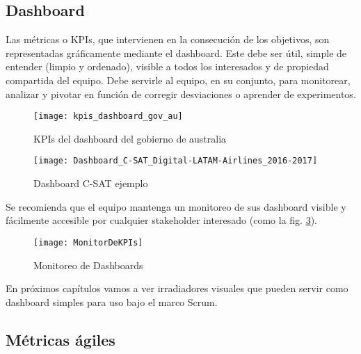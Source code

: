 \subsection{Dashboard}

Las métricas o KPIs, que intervienen en la consecución de los objetivos, son representadas gráficamente mediante el dashboard. Este debe ser útil, simple de entender (limpio y ordenado), visible a todos los interesados y de propiedad compartida del equipo. Debe servirle al equipo, en su conjunto, para monitorear, analizar y pivotar en función de corregir desviaciones o aprender de experimentos.

  \begin{figure}[h]
  \centering
  \texttt{[image: kpis\_dashboard\_gov\_au]}
  \caption{KPIs del dashboard del gobierno de australia}
  \centering
  \label{fig:kpis_dashboard_gov_au} %
  \end{figure}
  \FloatBarrier

  \begin{figure}[h]
  \centering
  \texttt{[image: Dashboard\_C-SAT\_Digital-LATAM-Airlines\_2016-2017]}
  \caption{Dashboard C-SAT ejemplo}
  \centering
  \label{fig:Dashboard_C-SAT_Digital-LATAM-Airlines_2016-2017} %
  \end{figure}
  \FloatBarrier
  
  Se recomienda que el equipo mantenga un monitoreo de sus dashboard visible y fácilmente accesible por cualquier stakeholder interesado (como la fig. \ref{fig:MonitorDeKPIs}).
  
  \begin{figure}[h]
  \centering
  \texttt{[image: MonitorDeKPIs]}
  \caption{Monitoreo de Dashboards}
  \centering
  \label{fig:MonitorDeKPIs} %
\end{figure}
\FloatBarrier %


En próximos capítulos vamos a ver irradiadores visuales que pueden servir como dashboard simples para uso bajo el marco Scrum.

\subsection{Métricas ágiles}

